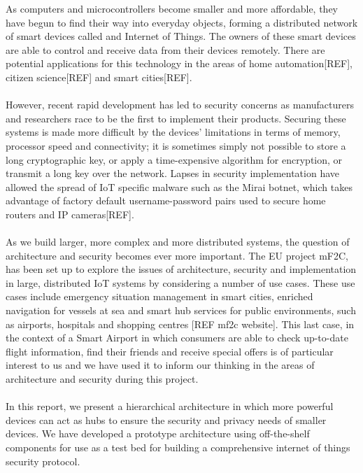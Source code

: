 As computers and microcontrollers become smaller and more affordable, they have begun to find their way into everyday objects, forming a distributed network of smart devices called and Internet of Things. The owners of these smart devices are able to control and receive data from their devices remotely. There are potential applications for this technology in the areas of home automation[REF], citizen science[REF] and smart cities[REF].

\paragraph{}
However, recent rapid development has led to security concerns as manufacturers and researchers race to be the first to implement their products. Securing these systems is made more difficult by the devices’ limitations in terms of memory, processor speed and connectivity; it is sometimes simply not possible to store a long cryptographic key, or apply a time-expensive algorithm for encryption, or transmit a long key over the network. Lapses in security implementation have allowed the spread of IoT specific malware such as the Mirai botnet, which takes advantage of factory default username-password pairs used to secure home routers and IP cameras[REF].

\paragraph{}
As we build larger, more complex and more distributed systems, the question of architecture and security becomes ever more important. The EU project mF2C, has been set up to explore the issues of architecture, security and implementation in large, distributed IoT systems by considering a number of use cases. These use cases include emergency situation management in smart cities, enriched navigation for vessels at sea and smart hub services for public environments, such as airports, hospitals and shopping centres [REF mf2c website]. This last case, in the context of a Smart Airport in which consumers are able to check up-to-date flight information, find their friends and receive special offers is of particular interest to us and we have used it to inform our thinking in the areas of architecture and security during this project.
 
\paragraph{}
In this report, we present a hierarchical architecture in which more powerful devices can act as hubs to ensure the security and privacy needs of smaller devices.  We have developed a prototype architecture using off-the-shelf components for use as a test bed for building a comprehensive internet of things security protocol.
